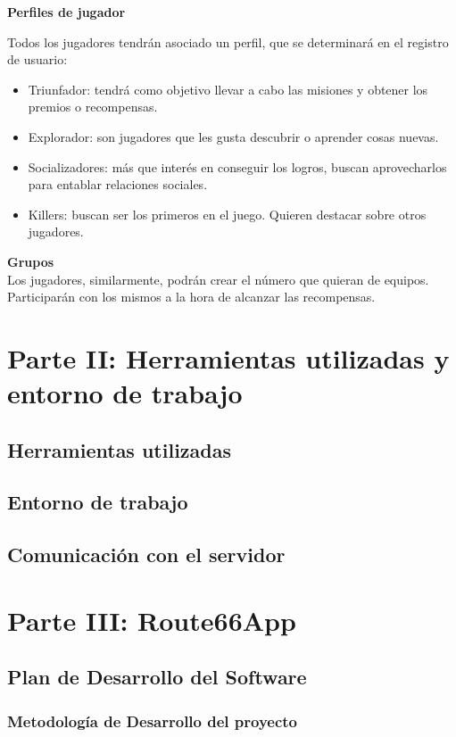 \documentclass[twoside]{report}
\begin{document}
\textbf{Perfiles de jugador}\\ \cite{iebsctj}

Todos los jugadores tendrán asociado un perfil, que se determinará en el registro de usuario:
\begin{itemize}

\item Triunfador: tendrá como objetivo llevar a cabo las misiones y obtener los premios o recompensas.
\item Explorador: son jugadores que les gusta descubrir o aprender cosas nuevas.
\item Socializadores: más que interés en conseguir los logros, buscan aprovecharlos para entablar relaciones sociales.
\item Killers: buscan ser los primeros en el juego. Quieren destacar sobre otros jugadores.

\end{itemize}

\textbf{Grupos}\\

Los jugadores, similarmente, podrán crear el número que quieran de equipos. Participarán con los mismos a la hora de alcanzar las recompensas.
\chapter{Parte II: Herramientas utilizadas y entorno de trabajo}
\section{Herramientas utilizadas}
\section{Entorno de trabajo}
\section{Comunicación con el servidor}

\chapter{Parte III: Route66App}
\section{Plan de Desarrollo del Software}
\subsection{Metodología de Desarrollo del proyecto}
\end{document}
